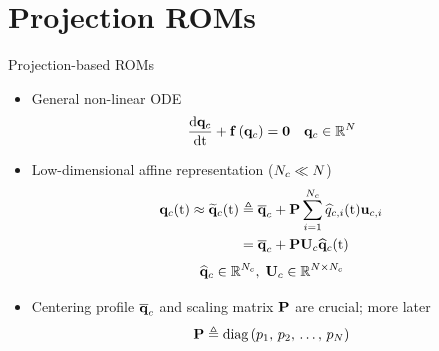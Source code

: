 \documentclass[]{beamer}
\begin{document}
\section*{Projection ROMs}

\begin{frame}{Projection-based ROMs}
    \begin{itemize}
		\item General non-linear ODE
		\begin{equation*}
			\frac{\text{d} \mathbf{q}_c}{\text{d} \text{t}} + \mathbf{f} \left(\mathbf{q}_c\right) = \mathbf{0} \quad \mathbf{q}_c \in \mathbb{R}^{N}
		\end{equation*}
			\item Low-dimensional affine representation ($N_c \ll N$)
		\begin{align*}
			\consVec(\timeVar) \approx \consVecRom(\timeVar) &\triangleq \consVecCent + \consScale \sum^{\numConsvModes}_{i=1} \consVarCoef(\timeVar) \consTrialVec \\
			&= \consVecCent + \consScale \consTrial \consVecCoef(\timeVar)
		\end{align*}
		\begin{equation*}
			\consVecCoef \in \mathbb{R}^{\numConsvModes}, \; \consTrial \in \mathbb{R}^{\numDOF \times \numConsvModes}
		\end{equation*}
		\item Centering profile $\mathbf{\overline{q}}_c$ and scaling matrix $\consScale$ are crucial; more later
		\begin{equation*}
			\consScale \triangleq \text{diag}\left( \consScaleVar_1, \, \consScaleVar_2, \, \hdots, \, \consScaleVar_{\numDOF} \right)
		\end{equation*}
	\end{itemize}
\end{frame}
\end{document}
